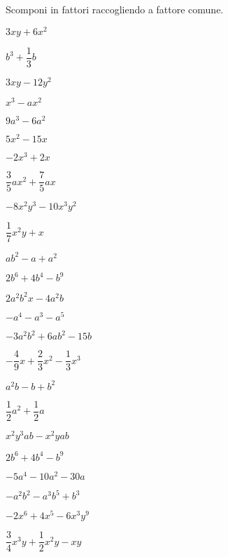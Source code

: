 \begin{esercizio}
\label{ese:div.010}
Scomponi in fattori raccogliendo a fattore comune.
\begin{multicols}{3}
\begin{enumeratea}
 \item \(3xy+6x^{2}\)
 \item \(b^{3}+\dfrac{1}{3}b\)
 \item \(3xy-12y^{2}\)
 \item \(x^{3}-ax^{2}\)
 \item \(9a^{3}-6a^{2}\)
 \item \(5x^{2}-15x\)
 \item \(-2x^{3}+2x\)
 \item \(\dfrac{3}{5}ax^{2}+\dfrac{7}{5}ax\)
 \item \(-8x^{2}y^{3}-10x^{3}y^{2}\)
 \item \(\dfrac{1}{7}x^{2}y+x\)
 \item \(ab^{2}-a+a^{2}\)
 \item \(2b^{6}+4b^{4}-b^{9}\)
 \item \(2a^{2}b^{2}x-4a^{2}b\)
 \item \(-a^{4}-a^{3}-a^{5}\)
 \item \(-3a^{2}b^{2}+6ab^{2}-15b\)
 \item \(-{\dfrac{4}{9}}x+\dfrac{2}{3}x^{2}-\dfrac{1}{3}x^{3}\)
 \item \(a^{2}b-b+b^{2}\)
 \item \(\dfrac{1}{2}a^{2}+\dfrac{1}{2}a\)
 \item \(x^{2}y^{3}ab-x^{2}yab\)
 \item \(2b^{6}+4b^{4}-b^{9}\)
 \item \(-5a^{4}-10a^{2}-30a\)
 \item \(-a^{2}b^{2}-a^{3}b^{5}+b^{3}\)
 \item \(-2x^{6}+4x^{5}-6x^{3}y^{9}\)
 \item \(\dfrac{3}{4}x^{3}y+\dfrac{1}{2}x^{2}y-xy\)
\end{enumeratea}
\end{multicols}
\end{esercizio}

